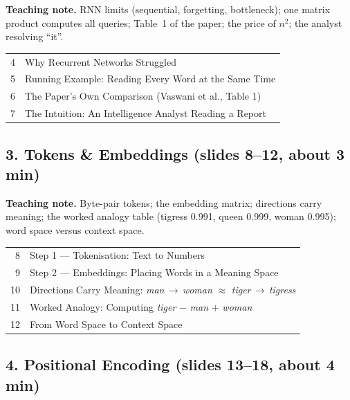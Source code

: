 \documentclass[11pt]{article}
\begin{document}
\textbf{Teaching note.} RNN limits (sequential, forgetting, bottleneck); one matrix product computes all queries; Table~1 of the paper; the price of $n^2$; the analyst resolving ``it''.

\begin{center}\small\renewcommand{\arraystretch}{1.1}\begin{tabularx}{\textwidth}{@{}r X@{}}4 & Why Recurrent Networks Struggled\\
5 & Running Example: Reading Every Word at the Same Time\\
6 & The Paper's Own Comparison (Vaswani et al., Table 1)\\
7 & The Intuition: An Intelligence Analyst Reading a Report\\\end{tabularx}\end{center}

\subsection{3. Tokens \& Embeddings \normalfont\small\color{GreyN}(slides 8--12, about 3 min)}

\textbf{Teaching note.} Byte-pair tokens; the embedding matrix; directions carry meaning; the worked analogy table (tigress 0.991, queen 0.999, woman 0.995); word space versus context space.

\begin{center}\small\renewcommand{\arraystretch}{1.1}\begin{tabularx}{\textwidth}{@{}r X@{}}8 & Step 1 --- Tokenisation: Text to Numbers\\
9 & Step 2 --- Embeddings: Placing Words in a Meaning Space\\
10 & Directions Carry Meaning: \emph{man}$\,\to\,$\emph{woman} $\approx$ \emph{tiger}$\,\to\,$\emph{tigress}\\
11 & Worked Analogy: Computing \emph{tiger} $-$ \emph{man} $+$ \emph{woman}\\
12 & From Word Space to Context Space\\\end{tabularx}\end{center}

\subsection{4. Positional Encoding \normalfont\small\color{GreyN}(slides 13--18, about 4 min)}
\end{document}
